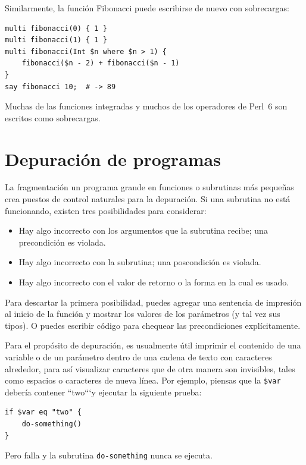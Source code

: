 Similarmente, la función Fibonacci puede escribirse de nuevo
con sobrecargas:

\begin{verbatim}
multi fibonacci(0) { 1 }
multi fibonacci(1) { 1 }
multi fibonacci(Int $n where $n > 1) { 
    fibonacci($n - 2) + fibonacci($n - 1) 
}
say fibonacci 10;  # -> 89
\end{verbatim}

Muchas de las funciones integradas y muchos de los operadores de Perl~6 
son escritos como sobrecargas.

\section{Depuración de programas}
\label{factdebug}

La fragmentación un programa grande en funciones o subrutinas más
pequeñas crea puestos de control naturales para la depuración.
Si una subrutina no está funcionando, existen tres posibilidades
para considerar:

\begin{itemize}

\item Hay algo incorrecto con los argumentos que la subrutina
recibe; una precondición es violada.

\item Hay algo incorrecto con la subrutina; una poscondición
es violada.

\item Hay algo incorrecto con el valor de retorno o la forma
en la cual es usado.

\end{itemize}

Para descartar la primera posibilidad, puedes agregar una
sentencia de impresión al inicio de la función y mostrar los valores
de los parámetros (y tal vez sus tipos). O puedes escribir 
código para chequear las precondiciones explícitamente.

Para el propósito de depuración, es usualmente útil imprimir
el contenido de una variable o de un parámetro dentro de 
una cadena de texto con caracteres alrededor, para así 
visualizar caracteres que de otra manera son invisibles, tales
como espacios o caracteres de nueva línea. Por ejemplo, piensas
que la \verb|$var| debería contener ``two```y ejecutar la 
siguiente prueba:
\begin{verbatim}
if $var eq "two" {
    do-something()
}
\end{verbatim}
%
Pero falla y la subrutina {\tt do-something} nunca se ejecuta.

